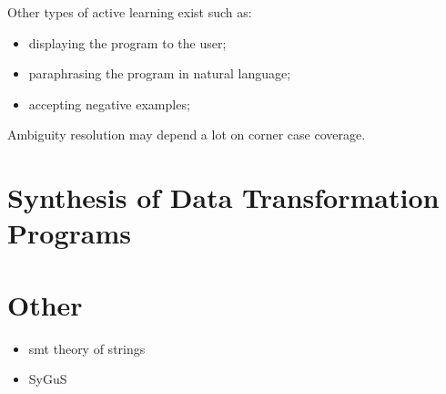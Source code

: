 Other types of active learning exist such as:
\begin{itemize}
\item displaying the program to the user;
\item paraphrasing the program in natural language;
\item accepting negative examples; 
\end{itemize}

 Ambiguity resolution may depend a lot on corner case coverage.

\section{Synthesis of Data Transformation Programs}
\label{sec:data-trans-synth}


\section{Other}
\label{sec:other}

\begin{itemize}
\item smt theory of strings
\item SyGuS
\end{itemize}

